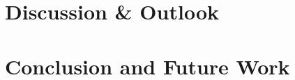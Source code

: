 \documentclass[12pt,a4paper]{article}
\title{\titlename}
\author{ \authorname\\ \scriptsize \authormail \\ \scriptsize \address }
\author{ \authorid\\ \scriptsize \address }
\date{\exposedate}
\begin{document}




\maketitle

\tableofcontents



\clearpage
\newpage


\clearpage
\newpage






\clearpage
\newpage



\clearpage
\newpage



\clearpage
\newpage
\section{Discussion \& Outlook}

\clearpage
\newpage
\section{Conclusion and Future Work}

\clearpage
\newpage
\lstlistoflistings

\clearpage
\newpage
\listoffigures



\clearpage
\newpage
{}
\printbibliography
\end{document}

